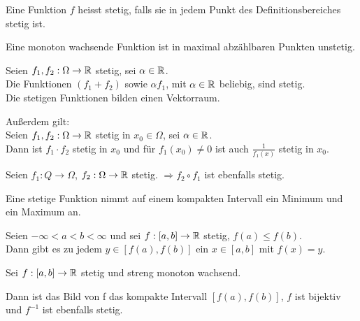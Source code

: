 \begin{definition}
Eine Funktion $f$ heisst stetig, falls sie in jedem Punkt des Definitionsbereiches stetig ist.\\
\end{definition}

\begin{theorem}
Eine monoton wachsende Funktion ist in maximal abzählbaren Punkten unstetig.
\end{theorem}

\begin{theorem}
Seien $f_1,f_2: \Omega \to \mathbb{R}$ stetig, sei $\alpha\in\mathbb{R}$.\\
Die Funktionen $(f_1 + f_2)$ sowie $\alpha f_1$, mit $\alpha \in \mathbb{R}$ beliebig, sind stetig.\\
Die stetigen Funktionen bilden einen Vektorraum.

Außerdem gilt:\\
Seien $f_1,f_2: \Omega \to \mathbb{R}$ stetig in $x_0\in\Omega$, sei $\alpha\in\mathbb{R}$.\\
Dann ist $f_1\cdot f_2$ stetig in $x_0$ und für $f_1(x_0)\neq 0$ ist auch $\frac{1}{f_1(x)}$ stetig in $x_0$.
\end{theorem}

\begin{theorem}
Seien $f_1:Q\to \Omega$, $f_2: \Omega \to \mathbb{R}$ stetig.
$\Rightarrow f_2\circ f_1$ ist ebenfalls stetig.
\end{theorem}

\begin{theorem}
Eine stetige Funktion nimmt auf einem kompakten Intervall ein Minimum und ein Maximum an.
\end{theorem}

\begin{theorem}[Zwischenwertsatz]
Seien $-\infty < a < b < \infty$ und sei $f: [a, b] \rightarrow \mathbb{R}$ stetig, $f(a) \leqslant f(b)$.\\
Dann gibt es zu jedem $y \in [f(a),f(b)]$ ein $x \in [a,b]$ mit $f(x) = y$.
\end{theorem}

\begin{theorem}
Sei $f:[a,b]\rightarrow\mathbb{R}$ stetig und streng monoton wachsend.

Dann ist das Bild von f das kompakte Intervall $[f(a),f(b)]$, $f$ ist bijektiv und $f^{-1}$ ist ebenfalls stetig.
\end{theorem}

